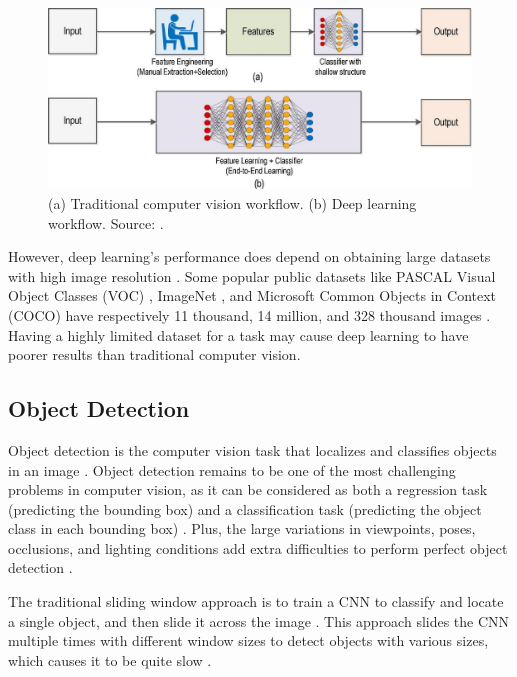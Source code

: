\documentclass[a4paper, 11pt, oneside]{article}
\begin{document}
\begin{figure}[ht]
  \begin{center}
    \includegraphics[width=.7\textwidth]{deep_learning_vs_traditional_computer_vision.png}
  \end{center}
  \caption{(a) Traditional computer vision workflow. (b) Deep learning workflow. Source: \cite{o2019deep}.}
\end{figure}

However, deep learning's performance does depend on obtaining large datasets with high image resolution \cite{o2019deep}.
Some popular public datasets like PASCAL Visual Object Classes (VOC) \cite{everingham2010pascal}, ImageNet
\cite{russakovsky2015imagenet}, and Microsoft Common Objects in Context (COCO) \cite{lin2014microsoft}
have respectively 11 thousand, 14 million, and 328 thousand images \cite{liu2020deep}. Having a highly limited dataset
for a task may cause deep learning to have poorer results than traditional computer vision.

\subsection{Object Detection}

\label{sec:objectdetection}

Object detection is the computer vision task that localizes and classifies objects in an image
\cite{elgendy2020deep, zhao2019object, liu2020deep, geron2019hands}. Object detection remains to be one of the most
challenging problems in computer vision, as it can be considered as both a regression task (predicting the bounding box)
and a classification task (predicting the object class in each bounding box)
\cite{elgendy2020deep, girshick2014rich, geron2019hands}. Plus, the large variations in viewpoints, poses, occlusions,
and lighting conditions add extra difficulties to perform perfect object detection \cite{zhao2019object, liu2020deep}.

The traditional sliding window approach is to train a CNN to classify and locate a single object, and then slide it
across the image \cite{geron2019hands, pasquet2017amphora, girshick2014rich, redmon2016you}. This approach slides the
CNN multiple times with different window sizes to detect objects with various sizes, which causes it to be quite slow
\cite{geron2019hands}.
\end{document}
